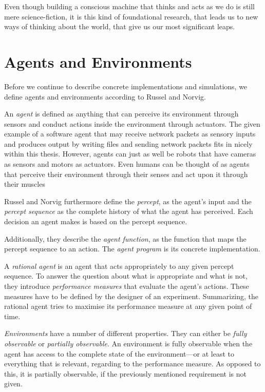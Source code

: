 Even though building a conscious machine that thinks and acts as we do is still mere science-fiction, it is this kind of foundational research, that leads us to new ways of thinking about the world, that give us our most significant leaps.
    
    \section{Agents and Environments}
Before we continue to describe concrete implementations and simulations, we define agents and environments according to Russel and Norvig.~\cite{russell2009artificial} 

An \emph{agent} is defined as anything that can perceive its environment through sensors and conduct actions inside the environment through actuators. The given example of a software agent that may receive network packets as sensory inputs and produces output by writing files and sending network packets fits in nicely within this thesis. However, agents can just as well be robots that have cameras as sensors and motors as actuators. Even humans can be thought of as agents that perceive their environment through their senses and act upon it through their muscles

Russel and Norvig furthermore define the \emph{percept}, as the agent's input and the \emph{percept sequence} as the complete history of what the agent has perceived. Each decision an agent makes is based on the percept sequence.

Additionally, they describe the \emph{agent function}, as the function that maps the percept sequence to an action. The \emph{agent program} is its concrete implementation.

A \emph{rational agent} is an agent that acts appropriately to any given percept sequence. To answer the question about what is appropriate and what is not, they introduce \emph{performance measures} that evaluate the agent's actions. These measures have to be defined by the designer of an experiment. Summarizing, the rational agent tries to maximise its performance measure at any given point of time.

\emph{Environments} have a number of different properties. They can either be \emph{fully observable} or \emph{partially observable}. An environment is fully observable when the agent has access to the complete state of the environment---or at least to everything that is relevant, regarding to the performance measure. As opposed to this, it is partially observable, if the previously mentioned requirement is not given.

